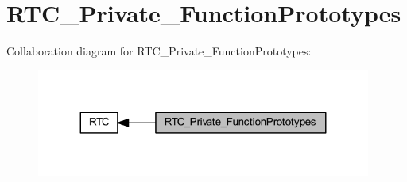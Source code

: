 \hypertarget{group___r_t_c___private___function_prototypes}{}\section{R\+T\+C\+\_\+\+Private\+\_\+\+Function\+Prototypes}
\label{group___r_t_c___private___function_prototypes}
Collaboration diagram for R\+T\+C\+\_\+\+Private\+\_\+\+Function\+Prototypes\+:
\nopagebreak
\begin{figure}[H]
\begin{center}
\leavevmode
\includegraphics[width=311pt]{group___r_t_c___private___function_prototypes}
\end{center}
\end{figure}
